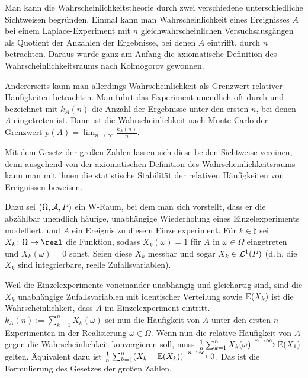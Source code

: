 \begin{Bem}
    Man kann die Wahrscheinlichkeitstheorie durch zwei verschiedene unterschiedliche Sichtweisen
    begründen.
    Einmal kann man Wahrscheinlichkeit eines Ereignisses $A$
    bei einem Laplace-Experiment mit $n$ gleichwahrscheinlichen Versuchsausgängen
    als Quotient der Anzahlen der Ergebnisse, bei denen $A$ eintrifft, durch $n$ betrachten.
    Daraus wurde ganz am Anfang die axiomatische Definition des Wahrscheinlichkeitsraums
    nach Kolmogorov gewonnen.
    
    Andererseits kann man allerdings Wahrscheinlichkeit als Grenzwert relativer Häufigkeiten
    betrachten.
    Man führt das Experiment unendlich oft durch und bezeichnet mit $k_A(n)$ die Anzahl der
    Ergebnisse unter den ersten $n$, bei denen $A$ eingetreten ist.
    Dann ist die Wahrscheinlichkeit nach Monte-Carlo der Grenzwert
    $p(A) = \lim_{n \to \infty} \frac{k_A(n)}{n}$.
    
    Mit dem Gesetz der großen Zahlen lassen sich diese beiden Sichtweise vereinen,
    denn ausgehend von der axiomatischen Definition des Wahrscheinlichkeitsraums kann man mit ihnen
    die statistische Stabilität der relativen Häufigkeiten von Ereignissen beweisen.
    
    Dazu sei $(\Omega, \mathcal{A}, P)$ ein W-Raum, bei dem man sich vorstellt, dass er
    die abzählbar unendlich häufige, unabhängige Wiederholung eines Einzelexperiments modelliert,
    und $A$ ein Ereignis zu diesem Einzelexperiment.
    Für $k \in \natural$ sei $X_k\colon \Omega \rightarrow \real$ die Funktion, sodass
    $X_k(\omega) = 1$ für $A$ in $\omega \in \Omega$ eingetreten und $X_k(\omega) = 0$ sonst.
    Seien diese $X_k$ messbar und sogar $X_k \in \mathcal{L}^1(P)$
    (d.\,h. die $X_k$ sind integrierbare, reelle Zufallsvariablen).
    
    Weil die Einzelexperimente voneinander unabhängig und gleichartig sind,
    sind die $X_k$ unabhängige Zufallsvariablen mit identischer Verteilung sowie
    $\mathbb{E}(X_k)$ ist die Wahrscheinlichkeit, dass $A$ im Einzelexperiment eintritt.
    $k_A(n) := \sum_{k=1}^n X_k(\omega)$ sei nun die Häufigkeit von $A$ unter den ersten
    $n$ Experimenten in der Realisierung $\omega \in \Omega$.
    Wenn nun die relative Häufigkeit von $A$ gegen die Wahrscheinlichkeit konvergieren soll,
    muss $\frac{1}{n} \sum_{k=1}^n X_k(\omega) \xrightarrow{n \to \infty} \mathbb{E}(X_1)$ gelten.
    Äquivalent dazu ist $\frac{1}{n} \sum_{k=1}^n (X_k - \mathbb{E}(X_k)) \xrightarrow{n \to \infty} 0$.
    Das ist die Formulierung des Gesetzes der großen Zahlen.
\end{Bem}

